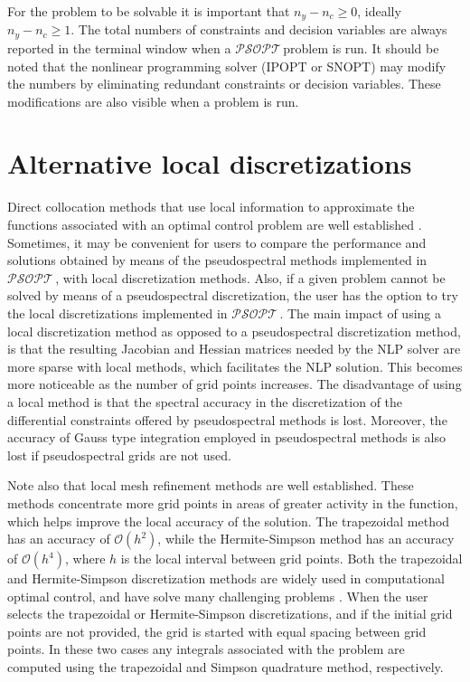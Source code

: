 \documentclass[a4paper,11pt]{report}    %
\newcommand{\psopt}{$\mathcal{PSOPT}$\,}  %
\begin{document}
\begin{itemize}
For the problem to be solvable it is important that $n_y-n_c \ge 0$, ideally $n_y-n_c \ge 1$. The total numbers of constraints and
decision variables are always reported in the terminal window when a \psopt problem is run. It should
be noted that the nonlinear programming solver (IPOPT or SNOPT) may modify the numbers by eliminating
redundant constraints or decision variables. These modifications are also visible when a problem is run. 


\end{itemize}


\section{Alternative local discretizations }

Direct collocation methods that use local information to approximate the functions associated with
an optimal control problem are well established \cite{Betts:01}.
Sometimes, it may be convenient for users to compare the performance and solutions obtained by means
of the pseudospectral methods implemented in \psopt, with local discretization methods. Also, if a given
problem cannot be solved by means of a pseudospectral discretization, the user has the option to
try the local discretizations implemented in \psopt. The main impact of using a local discretization method as
opposed to a pseudospectral discretization method, is that the resulting Jacobian and Hessian matrices needed
by the NLP solver are more sparse with local methods, which facilitates the NLP solution. This becomes
more noticeable as the number of grid points increases. The disadvantage of using a local method is that
the spectral accuracy in the discretization of the differential constraints  offered by pseudospectral
methods is lost.  Moreover, the accuracy of Gauss type integration employed in pseudospectral 
methods is also lost if pseudospectral grids are not used. 

Note also that  local
mesh refinement methods are well established. These methods concentrate more grid points in areas of greater activity in the function,
which helps improve the local accuracy of the solution. The trapezoidal
method has an accuracy of $\mathcal{O}(h^2)$, while the Hermite-Simpson method has an accuracy of $\mathcal{O}(h^4)$, where
$h$ is the local interval between grid points. Both the trapezoidal  and Hermite-Simpson discretization methods 
are widely used in computational optimal control, and have solve many challenging problems \cite{Betts:01}. 
When the user selects the trapezoidal or Hermite-Simpson discretizations, and if the initial grid points are not
provided, the grid is started with equal spacing between grid points.  In these two cases any integrals
associated with the problem are computed using the trapezoidal and Simpson quadrature method, respectively. 
\end{document}
